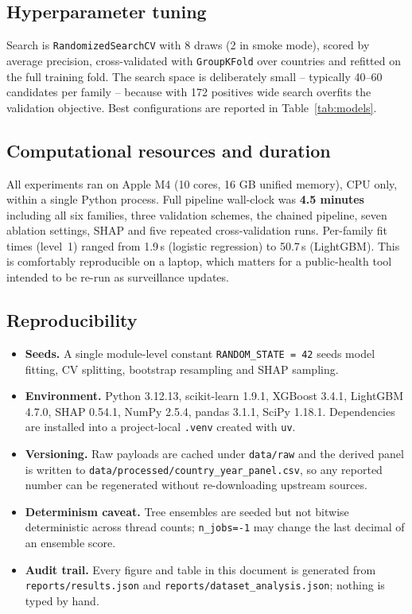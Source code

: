 \documentclass[11pt]{article}
\begin{document}
\subsection{Hyperparameter tuning}

Search is \texttt{RandomizedSearchCV} with 8 draws (2 in smoke mode), scored by average precision,
cross-validated with \texttt{GroupKFold} over countries and refitted on the full training fold.
The search space is deliberately small -- typically 40--60 candidates per family -- because with
172 positives wide search overfits the validation objective. Best configurations are
reported in Table~\ref{tab:models}.

\subsection{Computational resources and duration}

All experiments ran on Apple M4 (10 cores, 16 GB unified memory), CPU only, within a single Python process.
Full pipeline wall-clock was \textbf{4.5 minutes} including all six families, three
validation schemes, the chained pipeline, seven ablation settings, SHAP and five repeated
cross-validation runs. Per-family fit times (level~1) ranged from
1.9\,s (logistic regression) to
50.7\,s (LightGBM). This is comfortably reproducible
on a laptop, which matters for a public-health tool intended to be re-run as surveillance updates.

\subsection{Reproducibility}

\begin{itemize}
  \item \textbf{Seeds.} A single module-level constant \texttt{RANDOM\_STATE = 42} seeds model
        fitting, CV splitting, bootstrap resampling and SHAP sampling.
  \item \textbf{Environment.} Python 3.12.13, scikit-learn 1.9.1, XGBoost 3.4.1, LightGBM 4.7.0, SHAP 0.54.1, NumPy 2.5.4, pandas 3.1.1, SciPy 1.18.1. Dependencies are installed into a project-local
        \texttt{.venv} created with \texttt{uv}.
  \item \textbf{Versioning.} Raw payloads are cached under \texttt{data/raw} and the derived
        panel is written to \texttt{data/processed/country\_year\_panel.csv}, so any reported
        number can be regenerated without re-downloading upstream sources.
  \item \textbf{Determinism caveat.} Tree ensembles are seeded but not bitwise deterministic across
        thread counts; \texttt{n\_jobs=-1} may change the last decimal of an ensemble score.
  \item \textbf{Audit trail.} Every figure and table in this document is generated from
        \texttt{reports/results.json} and \texttt{reports/dataset\_analysis.json}; nothing is
        typed by hand.
\end{itemize}
\end{document}
